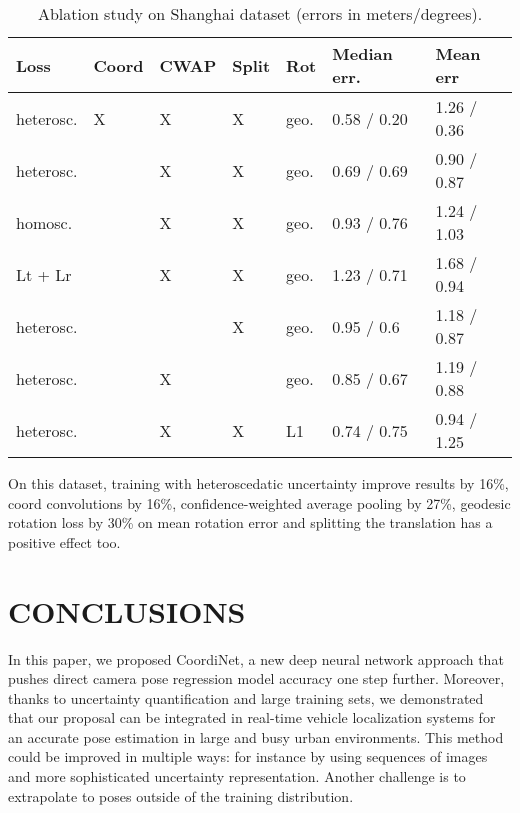 \documentclass[10pt,twocolumn,letterpaper]{article}
\begin{document}
\begin{table}[ht]
\centering
\scriptsize
\caption{\label{tab:ablation_study_results} Ablation study on Shanghai dataset (errors in meters/degrees).}
\begin{tabular}{|l|l|l|l|l|l|l|}
\hline
\textbf{Loss} & \textbf{Coord} & \textbf{CWAP} & \textbf{Split} & \textbf{Rot} & \textbf{Median err.} & \textbf{Mean err} \\ \hline
heterosc.     & X              & X             & X              & geo.          & 0.58 / 0.20        & 1.26 / 0.36       \\ \hline
heterosc.     &                & X             & X              & geo.          & 0.69 / 0.69         & 0.90 / 0.87       \\ \hline
homosc.       &                & X             & X              & geo.          & 0.93 / 0.76         & 1.24 / 1.03       \\ \hline
Lt + Lr       &                & X             & X              & geo.          & 1.23 / 0.71         & 1.68 / 0.94       \\ \hline
heterosc.     &                &               & X              & geo.          & 0.95 / 0.6         & 1.18 / 0.87       \\ \hline
heterosc.     &                & X             &                & geo.          & 0.85 / 0.67         & 1.19 / 0.88       \\ \hline
heterosc.     &                & X             & X              & L1           & 0.74 / 0.75         & 0.94 / 1.25       \\ \hline
\end{tabular}
\end{table}

On this dataset, training with heteroscedatic uncertainty improve results by 16\%, coord convolutions by 16\%, confidence-weighted average pooling by 27\%, geodesic rotation loss by 30\% on mean rotation error and splitting the translation has a positive effect too. 
\section{CONCLUSIONS}
\label{sec:conclusion}

In this paper, we proposed CoordiNet, a new deep neural network approach that pushes direct camera pose regression model accuracy one step further. Moreover, thanks to uncertainty quantification and large training sets, we demonstrated that our proposal can be integrated in real-time vehicle localization systems for an accurate pose estimation in large and busy urban environments.
This method could be improved in multiple ways: for instance by using sequences of images and more sophisticated uncertainty representation. Another challenge is to extrapolate to poses outside of the training distribution. 

{\small


}
\end{document}
